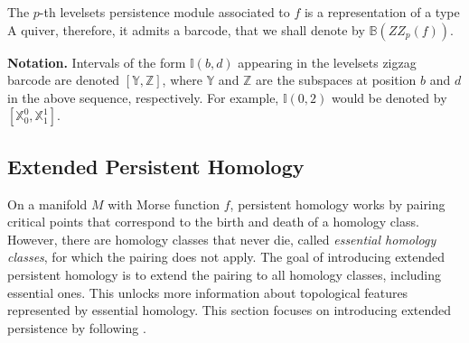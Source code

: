 \documentclass[11pt]{article}
\newtheorem{theorem}{Theorem}[section]
\theoremstyle{remark}
\newcommand{\Z}{\mathbb{Z}}
\newcommand{\R}{\mathbb{R}}
\newcommand{\I}{\mathbb{I}}
\newcommand{\X}{\mathbb{X}}
\newcommand{\Y}{\mathbb{Y}}
\newcommand{\B}{\mathbb{B}}
\begin{document}
The $p$-th levelsets persistence module associated to $f$ is a representation of a type A quiver, therefore, it admits a barcode, that we shall denote by $\B(ZZ_p(f))$.

\medskip


\noindent \textbf{Notation.} Intervals of the form $\I(b,d)$ appearing in the levelsets zigzag barcode are denoted $[\Y,\Z]$, where $\Y$ and $\Z$ are the subspaces at position $b$ and $d$ in the above sequence, respectively. For example, $\I(0,2)$ would be denoted by $[\X_0^0,\X_1^1]$.\\












\subsection{Extended Persistent Homology}
\label{extended}

On a manifold $M$ with Morse function $f$, persistent homology works by pairing critical points that correspond to the birth and death of a homology class. However, there are homology classes that never die, called \textit{essential homology classes}, for which the pairing does not apply. The goal of introducing extended persistent homology is to extend the pairing to all homology classes, including essential ones. This unlocks more information about topological features represented by essential homology. This section focuses on introducing extended persistence by following \cite{article}.
\end{document}
